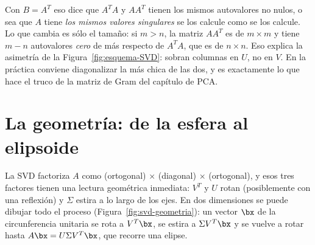 Con $B=A^T$ eso dice que $A^TA$ y $AA^T$ tienen los mismos autovalores no
nulos, o sea que $A$ tiene \emph{los mismos valores singulares} se los calcule
como se los calcule. Lo que cambia es sólo el tamaño: si $m>n$, la matriz
$AA^T$ es de $m\times m$ y tiene $m-n$ autovalores \emph{cero} de más respecto
de $A^TA$, que es de $n\times n$. Eso explica la asimetría de la
Figura~\ref{fig:esquema-SVD}: sobran columnas en $U$, no en $V$. En la
práctica conviene diagonalizar la más chica de las dos, y es exactamente lo
que hace el truco de la matriz de Gram del capítulo de PCA.

\section{La geometría: de la esfera al elipsoide}
\label{sec:geometria-SVD}

La SVD factoriza $A$ como (ortogonal) $\times$ (diagonal) $\times$
(ortogonal), y esos tres factores tienen una lectura geométrica inmediata:
$V^T$ y $U$ rotan (posiblemente con una reflexión) y $\Sigma$ estira a lo
largo de los ejes. En dos dimensiones se puede dibujar todo el proceso
(Figura~\ref{fig:svd-geometria}): un vector $\bx$ de la circunferencia
unitaria se rota a $V^T\bx$, se estira a $\Sigma V^T\bx$ y se vuelve a rotar
hasta $A\bx=U\Sigma V^T\bx$, que recorre una elipse.

